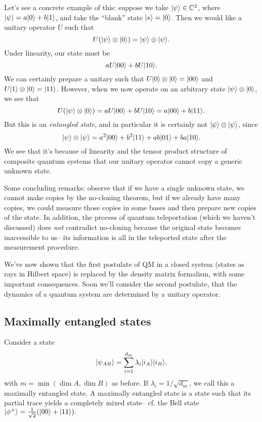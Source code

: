 \begin{exm}
    Let's see a concrete example of this: suppose we take $\lvert\psi\rangle\in \mathbb{C}^2$, where $\lvert\psi\rangle= a\lvert0\rangle + b\lvert1\rangle$, and take the ``blank'' state $\lvert s\rangle=\lvert0\rangle$. Then we would like a unitary operator $U$ such that
    \begin{equation}
        U(\lvert\psi\rangle\otimes \lvert0\rangle)=\lvert\psi\rangle\otimes \lvert\psi\rangle.
    \end{equation}
    Under linearity, our state must be
    \begin{equation}
        a U\lvert00\rangle+b U\lvert10\rangle.
    \end{equation}
    We can certainly prepare a unitary such that $U\lvert0\rangle\otimes \lvert0\rangle=\lvert00\rangle$ and $U\lvert1\rangle\otimes \lvert0\rangle=\lvert11\rangle$. However, when we now operate on an arbitrary state $\lvert\psi\rangle\otimes \lvert0\rangle$, we see that
    \begin{equation}
        U(\lvert\psi\rangle\otimes \lvert0\rangle)=aU \lvert00\rangle+b U\lvert10\rangle = a\lvert00\rangle +b\lvert11\rangle.
    \end{equation}
    But this is an \emph{entangled state}, and in particular it is certainly not $\lvert\psi\rangle\otimes \lvert\psi\rangle$, since
    \begin{equation}
        \lvert\psi\rangle\otimes \lvert\psi\rangle =a^2 \lvert00\rangle + b^2 \lvert11\rangle + ab\lvert01\rangle +ba \lvert10\rangle.
    \end{equation}
    We see that it's because of linearity and the tensor product structure of composite quantum systems that our unitary operator cannot copy a generic unknown state.
\end{exm}

Some concluding remarks: observe that if we have a single unknown state, we cannot make copies by the no-cloning theorem, but if we already have many copies, we could measure those copies in some bases and then prepare new copies of the state. In addition, the process of quantum teleportation (which we haven't discussed) does \emph{not} contradict no-cloning because the original state becomes inaccessible to us-- its information is all in the teleported state after the measurement procedure.

We've now shown that the first postulate of QM in a closed system (states as rays in Hilbert space) is replaced by the density matrix formalism, with some important consequences. Soon we'll consider the second postulate, that the dynamics of a quantum system are determined by a unitary operator.

\subsection*{Maximally entangled states} Consider a state
\begin{equation}
    \lvert\psi_{AB}\rangle=\sum_{i=1}^{d_m} \lambda_i \lvert i_A\rangle \lvert i_B\rangle,
\end{equation}
with $m=\min(\dim A,\dim B)$ as before. If $\lambda_i=1/\sqrt{d_m}$, we call this a maximally entangled state. A maximally entangled state is a state such that its partial trace yields a completely mixed state-- cf. the Bell state $\lvert\phi^+\rangle=\frac{1}{\sqrt{2}}(\lvert00\rangle+\lvert11\rangle).$